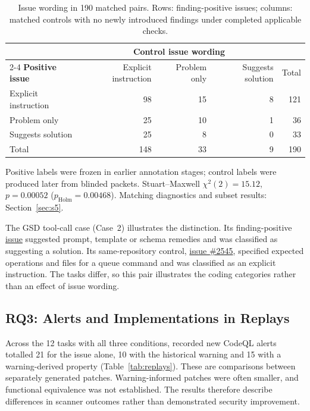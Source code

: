 \documentclass[acmsmall,screen,nonacm]{acmart}
\begin{document}
\begin{table}[H]
\caption{Issue wording in 190 matched pairs. Rows: finding-positive issues; columns: matched controls with no newly introduced findings under completed applicable checks.}
\label{tab:rq2}
\small
\begin{tabular}{@{}lrrrr@{}}
\toprule
& \multicolumn{3}{c}{\textbf{Control issue wording}} & \\
\cmidrule(lr){2-4}
\textbf{Positive issue} & Explicit instruction & Problem only & Suggests solution & Total\\
\midrule
Explicit instruction & 98 & 15 & 8 & 121\\
Problem only & 25 & 10 & 1 & 36\\
Suggests solution & 25 & 8 & 0 & 33\\
\midrule
Total & 148 & 33 & 9 & 190\\
\bottomrule
\end{tabular}
\par\smallskip\raggedright\footnotesize Positive labels were frozen in earlier annotation stages; control labels were produced later from blinded packets. Stuart--Maxwell $\chi^2(2)=15.12$, $p=0.00052$ ($p_{\mathrm{Holm}}=0.00468$). Matching diagnostics and subset results: Section~\ref{sec:s5}.
\end{table}

The GSD tool-call case (Case~2) illustrates the distinction. Its finding-positive \href{https://github.com/gsd-build/gsd-2/issues/2660}{issue} suggested prompt, template or schema remedies and was classified as suggesting a solution. Its same-repository control, \href{https://github.com/gsd-build/gsd-2/issues/2545}{issue \#2545}, specified expected operations and files for a queue command and was classified as an explicit instruction. The tasks differ, so this pair illustrates the coding categories rather than an effect of issue wording.

\subsection{RQ3: Alerts and Implementations in Replays}\label{sec:rq3-res}



Across the 12 tasks with all three conditions, recorded new CodeQL alerts totalled 21 for the issue alone, 10 with the historical warning and 15 with a warning-derived property (Table~\ref{tab:replays}). These are comparisons between separately generated patches. Warning-informed patches were often smaller, and functional equivalence was not established. The results therefore describe differences in scanner outcomes rather than demonstrated security improvement.
\end{document}
